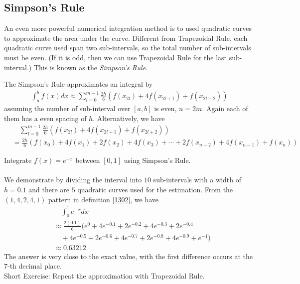 \subsection{Simpson's Rule}
An even more powerful numerical integration method is to used quadratic curves to approximate the area under the curve. Different from Trapezoidal Rule, each quadratic curve used span two sub-intervals, so the total number of sub-intervals must be even. (If it is odd, then we can use Trapezoidal Rule for the last sub-interval.) This is known as the \textit{Simpson's Rule}.
\begin{defn}
\label{1302}
The Simpson's Rule approximates an integral by
\begin{align*}
\int_a^b f(x) dx \approx \sum_{l=0}^{m-1} \frac{2h}{6} (f(x_{2l}) + 4f(x_{2l+1}) + f(x_{2l+2}))  
\end{align*}
assuming the number of sub-interval over $[a,b]$ is even, $n = 2m$. Again each of them has a even spacing of $h$. Alternatively, we have
\begin{align*}
&\quad \sum_{l=0}^{m-1} \frac{2h}{6} (f(x_{2l}) + 4f(x_{2l+1}) + f(x_{2l+2})) \\
&= \frac{2h}{6} (f(x_0) + 4f(x_1) + 2f(x_2) + 4f(x_3) + \cdots + 2f(x_{n-2}) + 4f(x_{n-1}) + f(x_n))
\end{align*}
\end{defn}

\begin{exmp}
Integrate $f(x) = e^{-x}$ between $[0,1]$ using Simpson's Rule.\\
\\
We demonstrate by dividing the interval into $10$ sub-intervals with a width of $h=0.1$ and there are $5$ quadratic curves used for the estimation. From the $(1, 4, 2, 4, 1)$ pattern in definition \ref{1302}, we have
\begin{align*}
&\quad \int_0^1 e^{-x} dx \\
&\approx \frac{2(0.1)}{6}(e^0 + 4e^{-0.1} + 2e^{-0.2} + 4e^{-0.3} + 2e^{-0.4} \\
&\quad + 4e^{-0.5} + 2e^{-0.6} + 4e^{-0.7} + 2e^{-0.8} + 4e^{-0.9} + e^{-1}) \\
&\approx 0.63212
\end{align*}
The answer is very close to the exact value, with the first difference occurs at the $7$-th decimal place.\\ 
Short Exercise: Repeat the approximation with Trapezoidal Rule.
\end{exmp}

